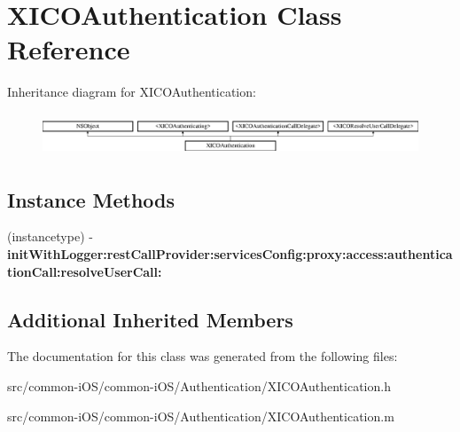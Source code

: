 \hypertarget{interface_x_i_c_o_authentication}{}\section{X\+I\+C\+O\+Authentication Class Reference}
\label{interface_x_i_c_o_authentication}
Inheritance diagram for X\+I\+C\+O\+Authentication\+:\begin{figure}[H]
\begin{center}
\leavevmode
\includegraphics[height=1.290323cm]{interface_x_i_c_o_authentication}
\end{center}
\end{figure}
\subsection*{Instance Methods}
\begin{DoxyCompactItemize}
\item 
\hypertarget{interface_x_i_c_o_authentication_a7b38013afc47e3876334c44b5203fcc2}{}\label{interface_x_i_c_o_authentication_a7b38013afc47e3876334c44b5203fcc2} 
(instancetype) -\/ {\bfseries init\+With\+Logger\+:rest\+Call\+Provider\+:services\+Config\+:proxy\+:access\+:authentication\+Call\+:resolve\+User\+Call\+:}
\end{DoxyCompactItemize}
\subsection*{Additional Inherited Members}


The documentation for this class was generated from the following files\+:\begin{DoxyCompactItemize}
\item 
src/common-\/i\+O\+S/common-\/i\+O\+S/\+Authentication/X\+I\+C\+O\+Authentication.\+h\item 
src/common-\/i\+O\+S/common-\/i\+O\+S/\+Authentication/X\+I\+C\+O\+Authentication.\+m\end{DoxyCompactItemize}
